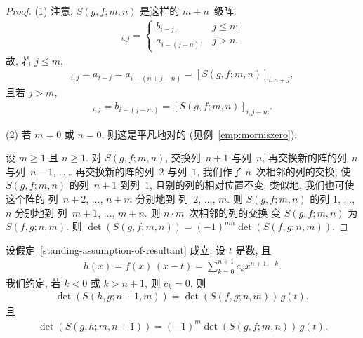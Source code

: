 \documentclass[../libro.tex]{subfiles}
\begin{document}
\begin{proof}
    (1)
    注意, \(S(g, f; m, n)\) 是这样的 \(m + n\)~级阵:
    \begin{align*}
        [S(g, f; m, n)]_{i,j} =
        \begin{cases}
            b_{i-j},     & j \leq n; \\
            a_{i-(j-n)}, & j > n.
        \end{cases}
    \end{align*}
    故, 若 \(j \leq m\),
    \begin{align*}
        [S(f, g; n, m)]_{i,j}
        = a_{i-j}
        = a_{i-(n+j-n)}
        = [S(g, f; m, n)]_{i,n+j},
    \end{align*}
    且若 \(j > m\),
    \begin{align*}
        [S(f, g; n, m)]_{i,j}
        = b_{i-(j-m)}
        = [S(g, f; m, n)]_{i,j-m}.
    \end{align*}

    (2)
    若 \(m = 0\) 或 \(n = 0\),
    则这是平凡地对的
    (见例~\ref{emp:morniszero}).

    设 \(m \geq 1\) 且 \(n \geq 1\).
    对 \(S(g, f; m, n)\),
    交换列~\(n + 1\) 与列~\(n\),
    再交换新的阵的列~\(n\) 与列~\(n - 1\),
    ……
    再交换新的阵的列~\(2\) 与列~\(1\),
    我们作了 \(n\)~次相邻的列的交换,
    使 \(S(g, f; m, n)\) 的列~\(n + 1\) 到列~\(1\),
    且别的列的相对位置不变.
    类似地, 我们也可使这个阵的%
    列~\(n + 2\), \(\dots\), \(n + m\)
    分别地到%
    列~\(2\), \(\dots\), \(m\).
    则 \(S(g, f; m, n)\) 的列 \(1\), \(\dots\), \(n\)
    分别地到%
    列~\(m + 1\), \(\dots\), \(m + n\).
    则 \(n \cdot m\)~次相邻的列的交换%
    变 \(S(g, f; m, n)\) 为 \(S(f, g; n, m)\).
    则
    \(\det {(S(g, f; m, n))}
    = (-1)^{m n} \det {(S(f, g; n, m))}\).
\end{proof}

\begin{theorem}\label{thm:resultant-recursive}
    设假定~\ref{standing-assumption-of-resultant} 成立.
    设 \(t\) 是数, 且
    \begin{align*}
        h(x)
        = f(x)\, (x - t)
        = \sum_{k = 0}^{n+1} {c_k x^{n+1-k}}.
    \end{align*}
    我们约定, 若 \(k < 0\) 或 \(k > n+1\), 则 \(c_k = 0\).
    则
    \begin{align*}
        \det {(S(h, g; n+1, m))} = \det {(S(f, g; n, m))}\, g(t),
    \end{align*}
    且
    \begin{align*}
        \det {(S(g, h; m, n+1))} = (-1)^m \det {(S(g, f; m, n))}\, g(t).
    \end{align*}
\end{theorem}
\end{document}
